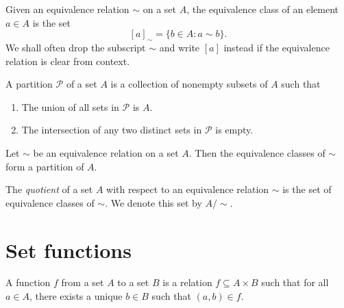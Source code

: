 \begin{definition}
    Given an equivalence relation \(\sim\) on a set \(A\), the equivalence class
    of an element \(a \in A\) is the set
    \[
        [a]_{\sim} = \{b \in A : a \sim b\}.
    \]
    We shall often drop the subscript \(\sim\) and write \([a]\) instead if the
    equivalence relation is clear from context.
\end{definition}

\begin{definition}
    A partition \(\mathcal{P}\) of a set \(A\) is a collection of nonempty
    subsets of \(A\) such that
    \begin{enumerate}[label=(\alph*)]
        \item The union of all sets in \(\mathcal{P}\) is \(A\).
        \item The intersection of any two distinct sets in \(\mathcal{P}\) is
        empty.
    \end{enumerate}
\end{definition}

\begin{theorem}
    Let \(\sim\) be an equivalence relation on a set \(A\). Then the equivalence
    classes of \(\sim\) form a partition of \(A\).
\end{theorem}

\begin{definition}
    The \emph{quotient} of a set \(A\) with respect to an equivalence relation
    \(\sim\) is the set of equivalence classes of \(\sim\). We denote this set
    by \(A/\sim\).
\end{definition}

\section{Set functions}

\begin{definition}
    A function \(f\) from a set \(A\) to a set \(B\) is a relation \(f \subseteq
    A \times B\) such that for all \(a \in A\), there exists a unique \(b \in
    B\) such that \((a, b) \in f\).
\end{definition}


